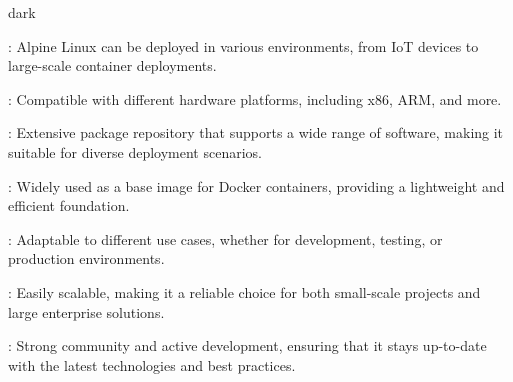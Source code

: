 \label{Versatility and Adaptability}
\begin{baseBoxThree}{}{dark}
    \begin{posnexItemize}
        \item[\sA] : Alpine Linux can be deployed in various environments, from IoT devices to large-scale container deployments.
        \item[\sA] : Compatible with different hardware platforms, including x86, ARM, and more. 
        \item[\sA] : Extensive package repository that supports a wide range of software, making it suitable for diverse deployment scenarios.
        \item[\sA] : Widely used as a base image for Docker containers, providing a lightweight and efficient foundation.
        \item[\sA] : Adaptable to different use cases, whether for development, testing, or production environments.
        \item[\sA] : Easily scalable, making it a reliable choice for both small-scale projects and large enterprise solutions.
        \item[\sA] : Strong community and active development, ensuring that it stays up-to-date with the latest technologies and best practices. 
    \end{posnexItemize}
\end{baseBoxThree}

